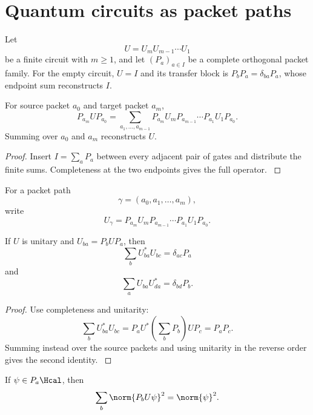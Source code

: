 \section{Quantum circuits as packet paths}\label{strong:section:004}\label{strong:sec:circuits}

Let
\[
U=U_mU_{m-1}\cdots U_1
\]
be a finite circuit with \(m\ge1\), and let \((P_a)_{a\in I}\) be a complete orthogonal packet family. For the empty circuit, \(U=I\) and its transfer block is \(P_bP_a=\delta_{ba}P_a\), whose endpoint sum reconstructs \(I\).

\begin{theorem}\label{strong:theorem:007}\label{strong:thm:circuit_path}
For source packet \(a_0\) and target packet \(a_m\),
\[
P_{a_m}UP_{a_0}
=
\sum_{a_1,\ldots,a_{m-1}}
P_{a_m}U_mP_{a_{m-1}}
\cdots
P_{a_1}U_1P_{a_0}.
\]
Summing over \(a_0\) and \(a_m\) reconstructs \(U\).
\end{theorem}

\begin{proof}\label{strong:proof:012}
Insert \(I=\sum_aP_a\) between every adjacent pair of gates and distribute the finite sums. Completeness at the two endpoints gives the full operator.
\label{strong:proof:012:end}\end{proof}

For a packet path
\[
\gamma=(a_0,a_1,\ldots,a_m),
\]
write
\[
U_\gamma
=
P_{a_m}U_mP_{a_{m-1}}
\cdots
P_{a_1}U_1P_{a_0}.
\]

\begin{theorem}\label{strong:theorem:008}\label{strong:thm:packet_unitarity}
If \(U\) is unitary and \(U_{ba}=P_bUP_a\), then
\[
\sum_bU_{ba}^*U_{bc}=\delta_{ac}P_a
\]
and
\[
\sum_aU_{ba}U_{da}^*=\delta_{bd}P_b.
\]
\end{theorem}

\begin{proof}\label{strong:proof:013}
Use completeness and unitarity:
\[
\sum_bU_{ba}^*U_{bc}
=
P_aU^*\left(\sum_bP_b\right)UP_c
=P_aP_c.
\]
Summing instead over the source packets and using unitarity in the reverse order gives the second identity.
\label{strong:proof:013:end}\end{proof}

\begin{corollary}\label{strong:corollary:005}\label{strong:cor:packet_probability}
If \(\psi\in P_a\Hcal\), then
\[
\sum_b\norm{P_bU\psi}^2=\norm{\psi}^2.
\]
\end{corollary}

